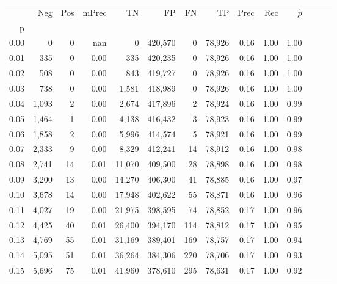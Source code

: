 \begin{tabular}{rrrrrrrrrrrrrr}
\toprule
{} &     Neg &    Pos & mPrec &       TN &       FP &      FN &      TP &  Prec &   Rec & $\hat{p}$ \\
p    &         &        &       &          &          &         &         &       &       &           \\
\midrule
0.00 &       0 &      0 &   nan &        0 &  420,570 &       0 &  78,926 &  0.16 &  1.00 &      1.00 \\
0.01 &     335 &      0 &  0.00 &      335 &  420,235 &       0 &  78,926 &  0.16 &  1.00 &      1.00 \\
0.02 &     508 &      0 &  0.00 &      843 &  419,727 &       0 &  78,926 &  0.16 &  1.00 &      1.00 \\
0.03 &     738 &      0 &  0.00 &    1,581 &  418,989 &       0 &  78,926 &  0.16 &  1.00 &      1.00 \\
0.04 &   1,093 &      2 &  0.00 &    2,674 &  417,896 &       2 &  78,924 &  0.16 &  1.00 &      0.99 \\
0.05 &   1,464 &      1 &  0.00 &    4,138 &  416,432 &       3 &  78,923 &  0.16 &  1.00 &      0.99 \\
0.06 &   1,858 &      2 &  0.00 &    5,996 &  414,574 &       5 &  78,921 &  0.16 &  1.00 &      0.99 \\
0.07 &   2,333 &      9 &  0.00 &    8,329 &  412,241 &      14 &  78,912 &  0.16 &  1.00 &      0.98 \\
0.08 &   2,741 &     14 &  0.01 &   11,070 &  409,500 &      28 &  78,898 &  0.16 &  1.00 &      0.98 \\
0.09 &   3,200 &     13 &  0.00 &   14,270 &  406,300 &      41 &  78,885 &  0.16 &  1.00 &      0.97 \\
0.10 &   3,678 &     14 &  0.00 &   17,948 &  402,622 &      55 &  78,871 &  0.16 &  1.00 &      0.96 \\
0.11 &   4,027 &     19 &  0.00 &   21,975 &  398,595 &      74 &  78,852 &  0.17 &  1.00 &      0.96 \\
0.12 &   4,425 &     40 &  0.01 &   26,400 &  394,170 &     114 &  78,812 &  0.17 &  1.00 &      0.95 \\
0.13 &   4,769 &     55 &  0.01 &   31,169 &  389,401 &     169 &  78,757 &  0.17 &  1.00 &      0.94 \\
0.14 &   5,095 &     51 &  0.01 &   36,264 &  384,306 &     220 &  78,706 &  0.17 &  1.00 &      0.93 \\
0.15 &   5,696 &     75 &  0.01 &   41,960 &  378,610 &     295 &  78,631 &  0.17 &  1.00 &      0.92 \\

\end{tabular}
